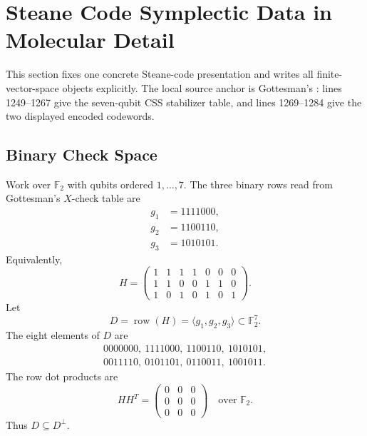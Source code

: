 
\section{Steane Code Symplectic Data in Molecular Detail}
\label{sec:steane-symplectic-molecular}

This section fixes one concrete Steane-code presentation and writes all
finite-vector-space objects explicitly. The local source anchor is Gottesman's
: lines 1249--1267 give the seven-qubit CSS stabilizer table,
and lines 1269--1284 give the two displayed encoded codewords.

\subsection{Binary Check Space}

Work over \(\mathbb F_2\) with qubits ordered \(1,\ldots,7\). The three
binary rows read from Gottesman's \(X\)-check table are
\[
\begin{aligned}
  g_1&=1111000,\\
  g_2&=1100110,\\
  g_3&=1010101.
\end{aligned}
\]
Equivalently,
\[
H=
\begin{pmatrix}
1&1&1&1&0&0&0\\
1&1&0&0&1&1&0\\
1&0&1&0&1&0&1
\end{pmatrix}.
\]
Let
\[
  D=\operatorname{row}(H)=\langle g_1,g_2,g_3\rangle\subset\mathbb F_2^7 .
\]
The eight elements of \(D\) are
\[
\begin{gathered}
0000000,\ 1111000,\ 1100110,\ 1010101,\\
0011110,\ 0101101,\ 0110011,\ 1001011 .
\end{gathered}
\]
The row dot products are
\[
HH^T=
\begin{pmatrix}
0&0&0\\
0&0&0\\
0&0&0
\end{pmatrix}
\quad \text{over } \mathbb F_2.
\]
Thus \(D\subseteq D^\perp\).

